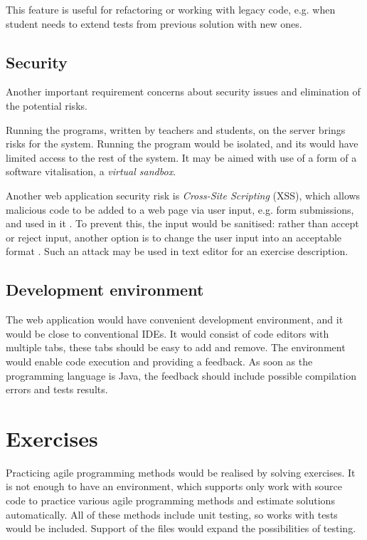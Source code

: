         This feature is useful for refactoring or working with legacy code, e.g. when student needs to extend tests from previous solution with new ones.
        
        \subsection{Security}
        Another important requirement concerns about security issues and elimination of the potential risks.
        
        Running the programs, written by teachers and students, on the server brings risks for the system. Running the program would be isolated, and its would have limited access to the rest of the system. It may be aimed with use of a form of a software vitalisation, a \textit{virtual sandbox}.
        
        Another web application security risk is \textit{Cross-Site Scripting} (XSS), which allows malicious code to be added to a web page via user input, e.g. form submissions, and used in it \cite[A7-Cross-Site Scripting (XSS)]{owasp_xss}. To prevent this, the input would be sanitised: rather than accept or reject input, another option is to change the user input into an acceptable format \cite[Sanitize]{owasp_sanitize}. Such an attack may be used in text editor for an exercise description.
        
        \subsection{Development environment}
        The web application would have convenient development environment, and it would be close to conventional IDEs. It would consist of code editors with multiple tabs, these tabs should be easy to add and remove. The environment would enable code execution and providing a feedback. As soon as the programming language is Java, the feedback should include possible compilation errors and tests results.

\section{Exercises}
\label{sec:exercises}
Practicing agile programming methods would be realised by solving exercises. It is not enough to have an environment, which supports only work with source code to practice various agile programming methods and estimate solutions automatically. All of these methods include unit testing, so works with tests would be included. Support of the files would expand the possibilities of testing.


